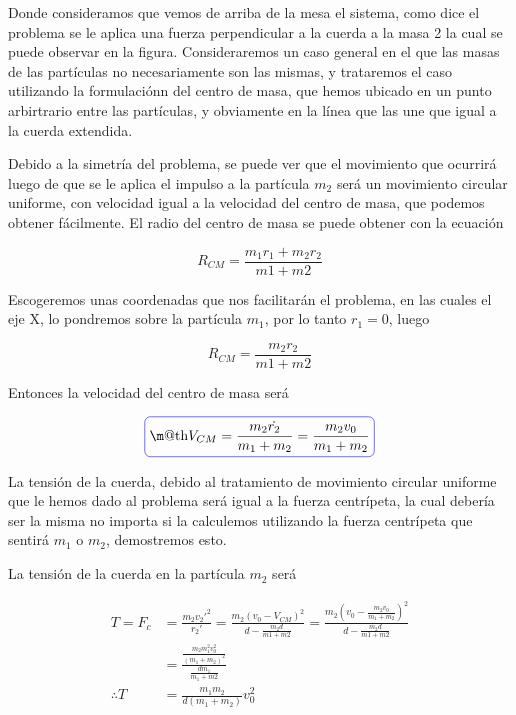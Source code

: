 \documentclass[a4paper,10pt]{article}
\makeatletter
\numberwithin{equation}{section}
\newcommand*{\boxcolor}{blue}
\renewcommand{\boxed}[1]{\textcolor{\boxcolor}{%
\tikz[baseline={([yshift=-1ex]current bounding box.center)}] \node [rectangle, minimum width=1ex,rounded corners,draw] {\normalcolor\m@th$\displaystyle#1$};}}
\makeatother
\begin{document}
Donde consideramos que vemos de arriba de la mesa el sistema, como dice el problema
se le aplica una fuerza perpendicular a la cuerda a la masa 2 la cual se puede observar
en la figura. Consideraremos un caso general en el que las masas de las partículas
no necesariamente son las mismas, y trataremos el caso utilizando la formulaciónn
del centro de masa, que hemos ubicado en un punto arbirtrario entre las partículas,
y obviamente en la línea que las une que igual a la cuerda extendida.

\vspace{.3cm}

Debido a la simetría del problema, se puede ver que el movimiento que ocurrirá
luego de que se le aplica el impulso a la partícula $m_2$ será un movimiento
circular uniforme, con velocidad igual a la velocidad del centro de masa, que podemos
obtener fácilmente. El radio del centro de masa se puede obtener con la ecuación

\begin{equation}
 R_{CM} = \frac{m_1 r_1 + m_2 r_2}{m1+m2}
 \label{eq:RadioCM1}
\end{equation}

Escogeremos unas coordenadas que nos facilitarán el problema, en las cuales el eje
X, lo pondremos sobre la partícula $m_1$, por lo tanto $r_1 = 0$, luego

\begin{equation}
 R_{CM} = \frac{m_2 r_2}{m1+m2}
 \label{eq:RadioCM2}
\end{equation}

Entonces la velocidad del centro de masa será

\begin{equation}
 \boxed{V_{CM} = \frac{m_2 \dot{r_2}}{m_1+m_2} = \frac{m_2 v_0}{m_1 + m_2}}
\end{equation}

La tensión de la cuerda, debido al tratamiento de movimiento circular uniforme que 
le hemos dado al problema será igual a la fuerza centrípeta, la cual debería ser
la misma no importa si la calculemos utilizando la fuerza centrípeta que 
sentirá $m_1$ o $m_2$, demostremos esto. 

\vspace{.3cm}

La tensión de la cuerda en la partícula $m_2$ será

\begin{align*}
 T = F_c &= \frac{m_2 v_2'^2}{r_2'} = \frac{m_2 (v_0-V_{CM})^2}{d - \frac{m_2 d}{m1+m2}} = 
 \frac{m_2 (v_0 - \frac{m_2 v_0}{m_1 + m_2})^2}{d - \frac{m_2 d}{m1+m2}} \\
 &= \frac{\frac{m_2 m_1^2 v_0^2}{(m_1+m_2)^2}}{\frac{d m_1}{m_1 + m2}} \\
%
 \therefore T &= \frac{m_1 m_2}{d(m_1 + m_2)} v_0^2
\end{align*}
\end{document}
